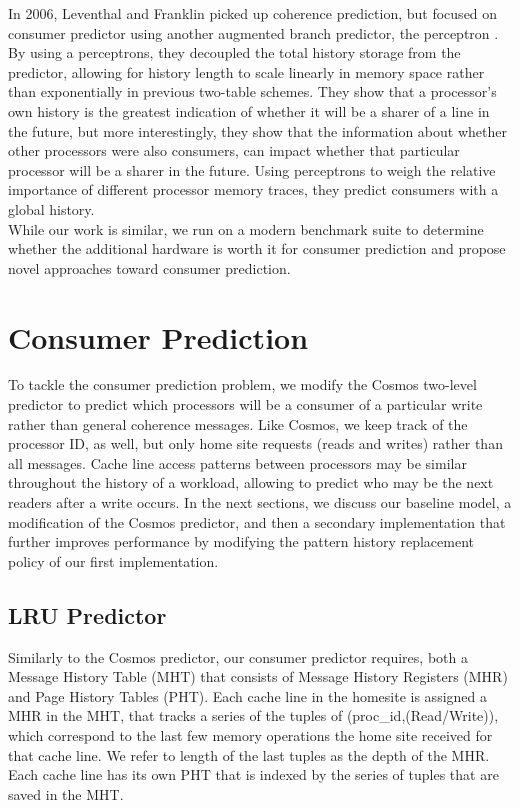     In 2006, Leventhal and Franklin picked up coherence prediction, but focused on consumer predictor using another augmented branch predictor, the perceptron \cite{leventhal_perceptron_2006}. By using a perceptrons, they decoupled the total history storage from the predictor, allowing for history length to scale linearly in memory space rather than exponentially in previous two-table schemes. They show that a processor's own history is the greatest indication of whether it will be a sharer of a line in the future, but more interestingly, they show that the information about whether other processors were also consumers, can impact whether that particular processor will be a sharer in the future. Using perceptrons to weigh the relative importance of different processor memory traces, they predict consumers with a global history. \\

    While our work is similar, we run on a modern benchmark suite to determine whether the additional hardware is worth it for consumer prediction and propose novel approaches toward consumer prediction. 

\section{Consumer Prediction}
    To tackle the consumer prediction problem, we modify the Cosmos two-level predictor \cite{mukherjee_using_nodate} to predict which processors will be a consumer of a particular write rather than general coherence messages. Like Cosmos, we keep track of the processor ID, as well, but only home site requests (reads and writes) rather than all messages. Cache line access patterns between processors may be similar throughout the history of a workload, allowing to predict who may be the next readers after a write occurs. In the next sections, we discuss our baseline model, a modification of the Cosmos predictor, and then a secondary implementation that further improves performance by modifying the pattern history replacement policy of our first implementation.
    
    \subsection{LRU Predictor}
    Similarly to the Cosmos predictor, our consumer predictor requires, both a Message History Table (MHT) that consists of Message History Registers (MHR) and Page History Tables (PHT). Each cache line in the homesite is assigned a MHR in the MHT, that tracks a series of the tuples of (proc\_id,(Read/Write)), which correspond to the last few memory operations the home site received for that cache line. We refer to length of the last tuples as the depth of the MHR. Each cache line has its own PHT that is indexed by the series of tuples that are saved in the MHT.\\


